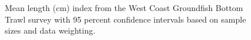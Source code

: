 \documentclass[
]{scrartcl}
\begin{document}
\begin{figure}[H]


\caption{\label{fig-meanlt-wcgbts}Mean length (cm) index from the West
Coast Groundfish Bottom Trawl survey with 95 percent confidence
intervals based on sample sizes and data weighting.}

\end{figure}%

\newpage
\end{document}
